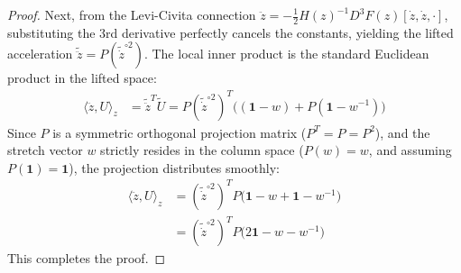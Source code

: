 \documentclass[11pt]{article}
\begin{document}
\begin{proof}
Next, from the Levi-Civita connection $\ddot{z} = -\frac{1}{2} H(z)^{-1} D^3F(z)[\dot{z}, \dot{z}, \cdot]$, substituting the 3rd derivative perfectly cancels the constants, yielding the lifted acceleration $\tilde{\ddot{z}} = P(\tilde{\dot{z}}^{\circ 2})$.
The local inner product is the standard Euclidean product in the lifted space:
\begin{align*}
    \langle \ddot{z}, U \rangle_z &= \tilde{\ddot{z}}^T \tilde{U} = P(\tilde{\dot{z}}^{\circ 2})^T \Big( (\mathbf{1} - w) + P(\mathbf{1} - w^{-1}) \Big)
\end{align*}
Since $P$ is a symmetric orthogonal projection matrix ($P^T = P = P^2$), and the stretch vector $w$ strictly resides in the column space ($P(w) = w$, and assuming $P(\mathbf{1}) = \mathbf{1}$), the projection distributes smoothly:
\begin{align*}
    \langle \ddot{z}, U \rangle_z &= (\tilde{\dot{z}}^{\circ 2})^T P \Big( \mathbf{1} - w + \mathbf{1} - w^{-1} \Big) \\
    &= (\tilde{\dot{z}}^{\circ 2})^T P \big( 2\mathbf{1} - w - w^{-1} \big)
\end{align*}
This completes the proof.
\end{proof}
\end{document}
